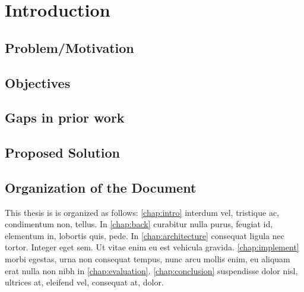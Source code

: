 \chapter{Introduction}
\chaptoc
\label{chap:intro}

\section{Problem/Motivation}

\section{Objectives}

\section{Gaps in prior work}

\section{Proposed Solution}

\section{Organization of the Document}
This thesis is is organized as follows: \ref{chap:intro} interdum vel, tristique ac, condimentum non, tellus. 
In \ref{chap:back} curabitur nulla purus, feugiat id, elementum in, lobortis quis, pede.
In \ref{chap:architecture} consequat ligula nec tortor. Integer eget sem. Ut vitae enim eu est vehicula gravida.
\ref{chap:implement} morbi egestas, urna non consequat tempus, nunc arcu mollis enim, eu aliquam erat nulla non nibh in \ref{chap:evaluation}.
\ref{chap:conclusion} suspendisse dolor nisl, ultrices at, eleifend vel, consequat at, dolor.